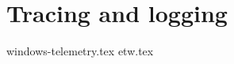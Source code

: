 \documentclass{report}
\begin{document}
\chapter{Tracing and logging}
\label{cha:tracing-and-logging}

{windows-telemetry.tex}
{etw.tex}
\end{document}
